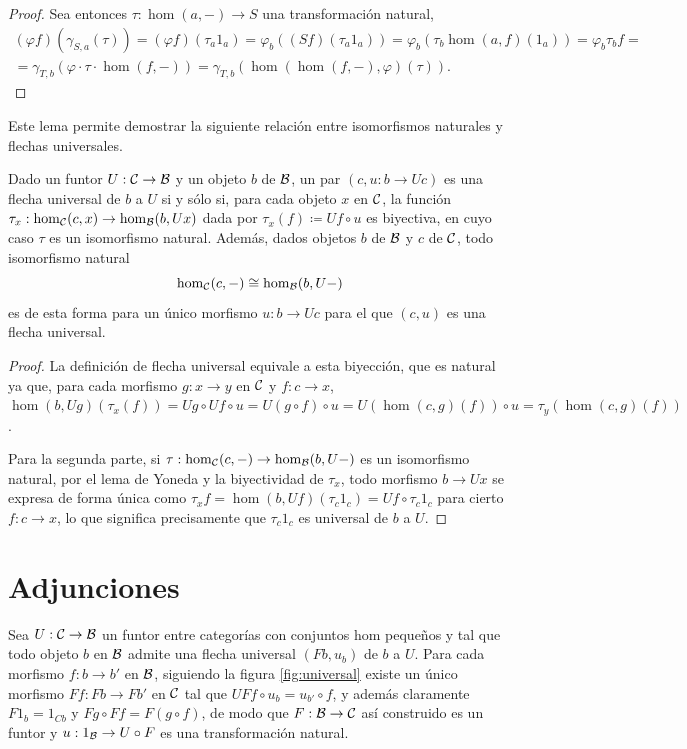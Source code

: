 \begin{proof}
  Sea entonces $\tau:\hom(a,-)\to S$ una transformación natural,
  \begin{multline*}
    (\varphi f)(\gamma_{S,a}(\tau))
    = (\varphi f)(\tau_a1_a)
    = \varphi_b((Sf)(\tau_a1_a))
    = \varphi_b(\tau_b\hom(a,f)(1_a))
    = \varphi_b\tau_bf = \\
    = \gamma_{T,b}(\varphi\cdot\tau\cdot\hom(f,-))
    = \gamma_{T,b}(\hom(\hom(f,-),\varphi)(\tau)).
  \end{multline*}
\end{proof}

Este lema permite demostrar la siguiente relación entre isomorfismos naturales y
flechas universales.

\begin{proposition}\label{prop:yoneda-prop}
  Dado un funtor $U:\mathcal{C}\to\mathcal{B}$ y un objeto $b$ de $\mathcal{B}$, un par $(c,u:b\to Uc)$
  es una flecha universal de $b$ a $U$ si y sólo si, para cada objeto $x$ en
  $\mathcal{C}$, la función $\tau_x:\hom_{\mathcal{C}}(c,x)\to\hom_{\mathcal{B}}(b,Ux)$ dada por
  $\tau_x(f)\coloneqq Uf\circ u$ es biyectiva, en cuyo caso $\tau$ es un
  isomorfismo natural. Además, dados objetos $b$ de $\mathcal{B}$ y $c$ de $\mathcal{C}$, todo
  isomorfismo natural \[
    \hom_{\mathcal{C}}(c,-)\cong\hom_{\mathcal{B}}(b,U-)
  \]
  es de esta forma para un único morfismo $u:b\to Uc$ para el que $(c,u)$ es una
  flecha universal.
\end{proposition}
\begin{proof}
  La definición de flecha universal equivale a esta biyección, que es natural ya
  que, para cada morfismo $g:x\to y$ en $\mathcal{C}$ y $f:c\to x$,
  $\hom(b,Ug)(\tau_x(f))=Ug\circ Uf\circ u=U(g\circ f)\circ
  u=U(\hom(c,g)(f))\circ u=\tau_y(\hom(c,g)(f))$.

  Para la segunda parte, si $\tau:\hom_{\mathcal{C}}(c,-)\to\hom_{\mathcal{B}}(b,U-)$ es un
  isomorfismo natural, por el lema de Yoneda y la biyectividad de $\tau_x$, todo
  morfismo $b\to Ux$ se expresa de forma única como
  $\tau_xf=\hom(b,Uf)(\tau_c1_c)=Uf\circ\tau_c1_c$ para cierto $f:c\to x$, lo
  que significa precisamente que $\tau_c1_c$ es universal de $b$ a $U$.
\end{proof}

\section{Adjunciones}

Sea $U:\mathcal{C}\to\mathcal{B}$ un funtor entre categorías con conjuntos hom pequeños y tal
que todo objeto $b$ en $\mathcal{B}$ admite una flecha universal $(Fb,u_b)$ de $b$ a
$U$. Para cada morfismo $f:b\to b'$ en $\mathcal{B}$, siguiendo la figura
\ref{fig:universal} existe un único morfismo $Ff:Fb\to Fb'$ en $\mathcal{C}$ tal que
$UFf\circ u_b=u_{b'}\circ f$, y además claramente $F1_b=1_{Cb}$ y
$Fg\circ Ff=F(g\circ f)$, de modo que $F:\mathcal{B}\to\mathcal{C}$ así construido es un funtor
y $u:1_{\mathcal{B}}\to U\circ F$ es una transformación natural.

